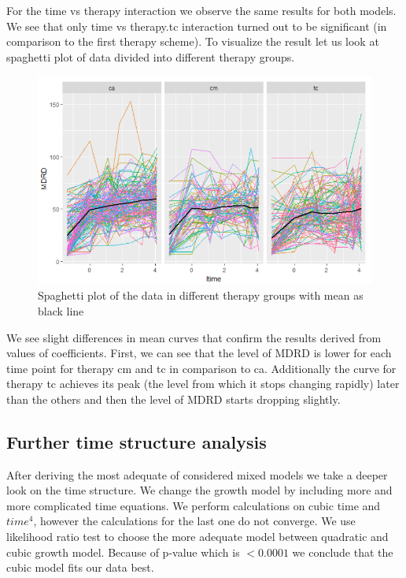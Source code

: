 \documentclass[num-refs]{wiley-article}
\begin{document}
For the time vs therapy interaction we observe the same results for both models. We see that only time vs therapy.tc interaction turned out to be significant (in comparison to the first therapy scheme). To visualize the result let us look at spaghetti plot of data divided into different therapy groups.

\begin{figure}[H] 
\centering
\includegraphics[height=0.4\textheight, width=\textwidth]{pictures/spaghetti.png}
\caption{Spaghetti plot of the data in different therapy groups with mean as black line} \label{spaghetti}
\end{figure}
We see slight differences in mean curves that confirm the results derived from values of coefficients. First, we can see that the level of MDRD is lower for each time point for therapy cm and tc in comparison to ca. Additionally the curve for therapy tc achieves its peak (the level from which it stops changing rapidly) later than the others and then the level of MDRD starts dropping slightly.

\subsection{Further time structure analysis}

After deriving the most adequate of considered mixed models we take a deeper look on the time structure. We change the growth model by including more and more complicated time equations. We perform calculations on cubic time and $time^4$, however the calculations for the last one do not converge. We use likelihood ratio test to choose the more adequate model between quadratic and cubic growth model. Because of p-value which is $< 0.0001$ we conclude that the cubic model fits our data best.
\end{document}
